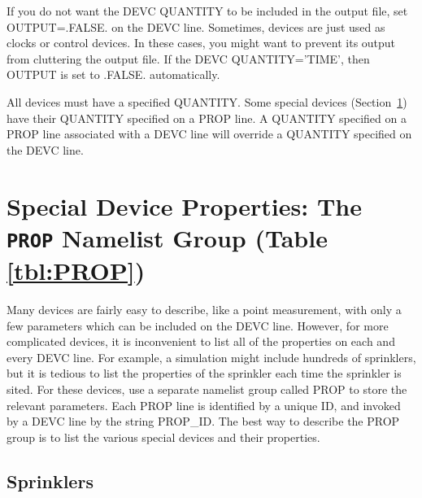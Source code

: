 \documentclass[11pt]{book}
\begin{document}
If you do not want the {\ct DEVC} {\ct QUANTITY} to be included in the output file, set {\ct OUTPUT=.FALSE.} on the {\ct DEVC} line. Sometimes, devices are just used as clocks or control devices. In these cases, you might want to prevent its output from cluttering the output file. If the {\ct DEVC} {\ct QUANTITY='TIME'}, then {\ct OUTPUT} is set to {\ct .FALSE.} automatically.



All devices must have a specified {\ct QUANTITY}.  Some special devices (Section~\ref{info:PROP}) have their {\ct QUANTITY} specified on a {\ct PROP} line. A {\ct QUANTITY} specified on a {\ct PROP} line associated with a {\ct DEVC} line will override a {\ct QUANTITY} specified on the {\ct DEVC} line.



\newpage

\section{Special Device Properties: The \texorpdfstring{{\tt PROP}}{PROP} Namelist Group (Table \ref{tbl:PROP})}
\label{info:PROP}

Many devices are fairly easy to describe, like a point measurement, with only a few parameters which can be included on the {\ct DEVC} line. However, for more complicated devices, it is inconvenient to list all of the properties on each and every {\ct DEVC} line. For example, a simulation might include hundreds of sprinklers, but it is tedious to list the properties of the sprinkler each time the sprinkler is sited. For these devices, use a separate namelist group called {\ct PROP} to store the relevant parameters. Each {\ct PROP} line is identified by a unique {\ct ID}, and invoked by a {\ct DEVC} line by the string {\ct PROP\_ID}. The best way to describe the {\ct PROP} group is to list the various special devices and their properties.


\subsection{Sprinklers}
\label{info:sprinklers}
\end{document}
